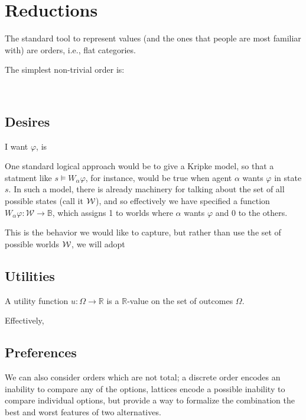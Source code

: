 \documentclass{article}
\begin{document}
	
	\section{Reductions}
	
	The standard tool to represent values (and the ones that people are most familiar with) are orders, i.e., flat categories. 
	
	The simplest non-trivial order is:
	\begin{center}
		\raisebox{0.7em}{$\mathbb B = $}~
	\end{center}
	
	\subsection{Desires}
	
	I want $\varphi$, is 
	
	One standard logical approach would be to give a Kripke model, so that a statment like $s \vDash W_{\alpha} \varphi$, for instance, would be true when agent $\alpha$ wants $\varphi$ in state $s$. In such a model, there is already machinery for talking about the set of all possible states (call it $\cal W$), and so effectively we have specified a function $W_\alpha \varphi: \mathcal W \to \mathbb B$, which assigns 1 to worlds where $\alpha$ wants $\varphi$ and 0 to the others.
	
	This is the behavior we would like to capture, but rather than use the set of possible worlds $\cal W$, we will adopt 
	
	
	\subsection{Utilities}
	
		
	
	A utility function $u : \Omega \to \mathbb R$ is a $\mathbb R$-value on the set of outcomes $\Omega$. 
	
	Effectively, 

	
	\subsection{Preferences}
	We can also consider orders which are not total; a discrete order encodes an inability to compare any of the options, lattices encode a possible inability to compare individual options, but provide a way to formalize the combination the best and worst features of two alternatives.
	
\end{document}
